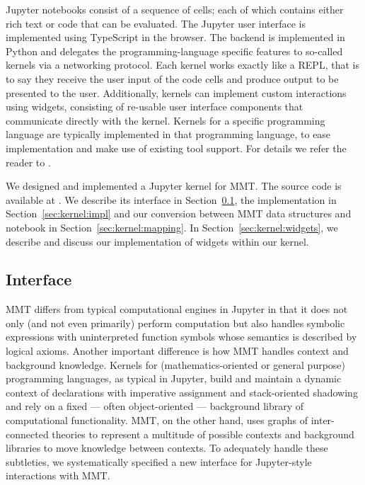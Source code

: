 Jupyter notebooks consist of a sequence of cells; each of which contains either rich text or code that can be evaluated. 
The Jupyter user interface is implemented using TypeScript in the browser.
The backend is implemented in Python and delegates the programming-language specific features to so-called kernels via a networking protocol. 
Each kernel works exactly like a REPL, that is to say they receive the user input of the code cells and produce output to be presented to the user. 
Additionally, kernels can implement custom interactions using widgets, consisting of re-usable user interface components that communicate directly with the kernel.  
Kernels for a specific programming language are typically implemented in that programming language, to ease implementation and make use of existing tool support.
For details we refer the reader to \cite{jupyter-doc:on}. 

We designed and implemented a Jupyter kernel for MMT. 
The source code is available at \cite{mmt_jupyter:on}. 
We describe its interface in Section~\ref{sec:kernel:syntax}, the implementation in Section~\ref{sec:kernel:impl} and our conversion between MMT data structures and notebook in Section~\ref{sec:kernel:mapping}.
In Section~\ref{sec:kernel:widgets}, we describe and discuss our implementation of widgets within our kernel. 

\subsection{Interface}\label{sec:kernel:syntax}

MMT differs from typical computational engines in Jupyter in that it does not only (and not even primarily) perform computation but also handles symbolic expressions with uninterpreted function symbols whose semantics is described by logical axioms.
Another important difference is how MMT handles context and background knowledge.
Kernels for (mathematics-oriented or general purpose) programming languages, as typical in Jupyter, build and maintain a dynamic context of declarations with imperative assignment and stack-oriented shadowing and rely on a fixed --- often object-oriented --- background library of computational functionality.
MMT, on the other hand, uses graphs of inter-connected theories to represent a multitude of possible contexts and background libraries to move knowledge between contexts.
To adequately handle these subtleties, we systematically specified a new interface for Jupyter-style interactions with MMT.


